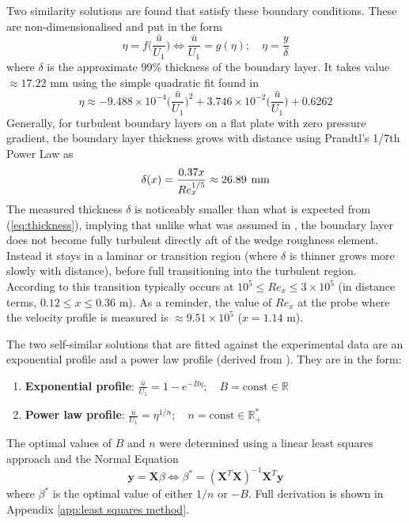 \documentclass{article}
\begin{document}
Two similarity solutions are found that satisfy these boundary conditions. These are non-dimensionalised and put in the form
\begin{equation}
    \eta = f\bigg(\frac{\bar{u}}{U_1}\bigg) \iff \frac{\bar{u}}{U_1} = g(\eta) ; \quad \eta = \frac{y}{\delta} 
\end{equation}
where $\delta$ is the approximate 99\% thickness of the boundary layer. It takes value $\approx 17.22$ \unit{\mm} using the simple quadratic fit found in 
\begin{equation}
    \eta \approx -9.488 \times 10^{-4} \bigg( \frac{\bar{u}}{U_1} \bigg)^2 + 3.746 \times 10^{-2} \bigg( \frac{\bar{u}}{U_1} \bigg) + 0.6262
    \label{eq:quadratic fit}
\end{equation}
Generally, for turbulent boundary layers on a flat plate with zero pressure gradient, the boundary layer thickness grows with distance using Prandtl's 1/7th Power Law \cite{beltran2019boundarylayerthickness} as
\begin{equation}
    \delta(x) = \frac{0.37 x}{Re_x^{1/5}} \approx 26.89 \hspace{0.4em} \unit{\mm}
    \label{eq:thickness}
\end{equation}
The measured thickness $\delta$ is noticeably smaller than what is expected from (\ref{eq:thickness}), implying that unlike what was assumed in , the boundary layer does not become fully turbulent directly aft of the wedge roughness element. Instead it stays in a laminar or transition region (where $\delta$ is thinner grows more slowly with distance), before full transitioning into the turbulent region. According to \cite{beltran2019boundarylayerthickness} this transition typically occurs at $10^5 \leq Re_x \le 3 \times 10^5$ (in distance terms, $0.12 \le x \le 0.36$ \unit{\metre}). As a reminder, the value of $Re_x$ at the probe where the velocity profile is measured is $\approx 9.51 \times 10^5$ ($x = 1.14$ \unit{\metre}).

The two self-similar solutions that are fitted against the experimental data are an exponential profile and a power law profile (derived from \cite{schlichting1961boundary}). They are in the form:
\begin{enumerate}[noitemsep]
    \item \textbf{Exponential profile}: $\displaystyle \frac{\bar{u}}{U_1} = 1-e^{-B\eta}; \quad B = \text{const} \in \mathbb{R}$
    \item \textbf{Power law profile}: $\displaystyle \frac{\bar{u}}{U_1} = \eta^{1/n}; \quad n = \text{const} \in \mathbb{R_+^*} $
\end{enumerate}
The optimal values of $B$ and $n$ were determined using a linear least squares approach and the Normal Equation
\begin{equation}
    \mathbf{y} = \mathbf{X}\beta \iff \beta^* = (\mathbf{X}^T\mathbf{X})^{-1}\mathbf{X}^T\mathbf{y}
\end{equation}
where $\beta^*$ is the optimal value of either $1/n$ or $-B$. Full derivation is shown in Appendix \ref{app:least squares method}.
\end{document}
